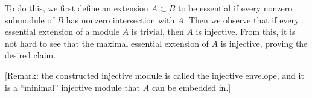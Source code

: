 To do this, we first define an extension $A \subset B$ to be essential if every nonzero submodule of $B$ has nonzero intersection with $A$. Then we observe that if every essential extension of a module $A$ is trivial, then $A$ is injective. From this, it is not hard to see that the maximal essential extension of $A$ is injective, proving the desired claim.

[Remark: the constructed injective module is called the injective envelope, and it is a ``minimal'' injective module that $A$ can be embedded in.]

